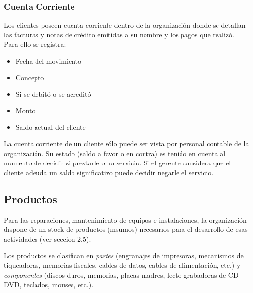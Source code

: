 \documentclass[12pt]{extarticle}
\begin{document}
\begin{spacing}{1.2}
    \subsubsection{Cuenta Corriente}
        Los clientes poseen cuenta corriente dentro de la organización donde se detallan las facturas y notas de crédito emitidas a su nombre y los pagos que realizó.\\
        Para ello se registra:
        \begin{itemize}
            \item Fecha del movimiento
            \item Concepto
            \item Si se debitó o se acreditó
            \item Monto
            \item Saldo actual del cliente
        \end{itemize}

        La cuenta corriente de un cliente sólo puede ser vista por personal contable de la organización. Su estado (saldo a favor o en contra) es tenido en cuenta al momento de decidir si prestarle o no servicio. Si el gerente considera que el cliente adeuda un saldo significativo puede decidir negarle el servicio.

    \pagebreak
    \subsection{Productos}
        Para las reparaciones, mantenimiento de equipos e instalaciones, la organización dispone de un stock de productos (insumos) necesarios para el desarrollo de esas actividades (ver seccion 2.5).
    
        Los productos se clasifican en \textit{partes} (engranajes de impresoras, mecanismos de tiqueadoras, memorias fiscales, cables de datos, cables de alimentación, etc.) y \textit{componentes} (discos duros, memorias, placas madres, lecto-grabadoras de CD-DVD, teclados, mouses, etc.).\\


\end{spacing}
\end{document}
